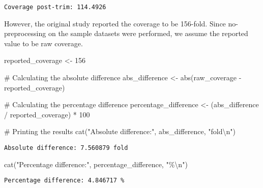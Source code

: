 \documentclass[
  letterpaper,
  DIV=11,
  numbers=noendperiod]{scrartcl}
\newenvironment{Shaded}{\begin{snugshade}}{\end{snugshade}}
\newcommand{\CommentTok}[1]{\textcolor[rgb]{0.37,0.37,0.37}{#1}}
\newcommand{\DecValTok}[1]{\textcolor[rgb]{0.68,0.00,0.00}{#1}}
\newcommand{\FunctionTok}[1]{\textcolor[rgb]{0.28,0.35,0.67}{#1}}
\newcommand{\NormalTok}[1]{\textcolor[rgb]{0.00,0.23,0.31}{#1}}
\newcommand{\OtherTok}[1]{\textcolor[rgb]{0.00,0.23,0.31}{#1}}
\newcommand{\SpecialCharTok}[1]{\textcolor[rgb]{0.37,0.37,0.37}{#1}}
\newcommand{\StringTok}[1]{\textcolor[rgb]{0.13,0.47,0.30}{#1}}
\begin{document}
\begin{verbatim}
Coverage post-trim: 114.4926 
\end{verbatim}

However, the original study reported the coverage to be 156-fold. Since
no-preprocessing on the sample datasets were performed, we assume the
reported value to be raw coverage.

\begin{Shaded}
\begin{Highlighting}[]
\NormalTok{reported\_coverage }\OtherTok{\textless{}{-}} \DecValTok{156}

\CommentTok{\# Calculating the absolute difference}
\NormalTok{abs\_difference }\OtherTok{\textless{}{-}} \FunctionTok{abs}\NormalTok{(raw\_coverage }\SpecialCharTok{{-}}\NormalTok{ reported\_coverage)}

\CommentTok{\# Calculating the percentage difference}
\NormalTok{percentage\_difference }\OtherTok{\textless{}{-}}\NormalTok{ (abs\_difference }\SpecialCharTok{/}\NormalTok{ reported\_coverage) }\SpecialCharTok{*} \DecValTok{100}

\CommentTok{\# Printing the results}
\FunctionTok{cat}\NormalTok{(}\StringTok{"Absolute difference:"}\NormalTok{, abs\_difference, }\StringTok{"fold}\SpecialCharTok{\textbackslash{}n}\StringTok{"}\NormalTok{)}
\end{Highlighting}
\end{Shaded}

\begin{verbatim}
Absolute difference: 7.560879 fold
\end{verbatim}

\begin{Shaded}
\begin{Highlighting}[]
\FunctionTok{cat}\NormalTok{(}\StringTok{"Percentage difference:"}\NormalTok{, percentage\_difference, }\StringTok{"\%}\SpecialCharTok{\textbackslash{}n}\StringTok{"}\NormalTok{)}
\end{Highlighting}
\end{Shaded}

\begin{verbatim}
Percentage difference: 4.846717 %
\end{verbatim}
\end{document}
